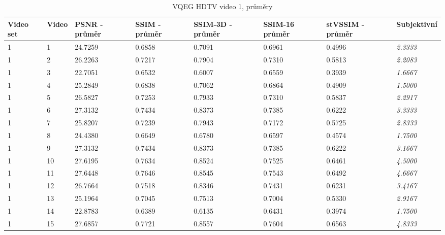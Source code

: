 \documentclass[thesis=M,czech]{FITthesis}[2016/06/26]
\begin{document}
\begin{table}[]
\centering
\begin{tabular}{|p{.85cm}|p{.85cm}|p{1.3cm}|p{1.3cm}|p{1.5cm}|p{1.5cm}|p{1.5cm}|p{1.8cm}|}
\hline
Video set & Video & PSNR - průměr & SSIM - průměr & SSIM-3D - průměr & SSIM-16 průměr & stVSSIM - průměr & Subjektivní \\ \hline
1         & 1     & 24.7259       & 0.6858        & 0.7091           & 0.6961         & 0.4996           & \textit{2.3333}      \\ \hline
1         & 2     & 26.2263       & 0.7217        & 0.7904           & 0.7310         & 0.5813           & \textit{2.2083}      \\ \hline
1         & 3     & 22.7051       & 0.6532        & 0.6007           & 0.6559         & 0.3939           & \textit{1.6667}      \\ \hline
1         & 4     & 25.2849       & 0.6838        & 0.7062           & 0.6864         & 0.4909           & \textit{1.5000}      \\ \hline
1         & 5     & 26.5827       & 0.7253        & 0.7933           & 0.7310         & 0.5837           & \textit{2.2917}      \\ \hline
1         & 6     & 27.3132       & 0.7434        & 0.8373           & 0.7385         & 0.6222           & \textit{3.3333}     \\ \hline
1         & 7     & 25.8207       & 0.7239        & 0.7943           & 0.7172         & 0.5725           & \textit{2.8333}      \\ \hline
1         & 8     & 24.4380       & 0.6649        & 0.6780           & 0.6597         & 0.4574           & \textit{1.7500}      \\ \hline
1         & 9     & 27.3132       & 0.7434        & 0.8373           & 0.7385         & 0.6222           & \textit{3.1667}      \\ \hline
1         & 10    & 27.6195       & 0.7634        & 0.8524           & 0.7525         & 0.6461           & \textit{4.5000}      \\ \hline
1         & 11    & 27.6448       & 0.7646        & 0.8545           & 0.7543         & 0.6492           & \textit{4.6667}      \\ \hline
1         & 12    & 26.7664       & 0.7518        & 0.8346           & 0.7431         & 0.6231           & \textit{3.4167}      \\ \hline
1         & 13    & 25.1964       & 0.7045        & 0.7513           & 0.7004         & 0.5330           & \textit{2.9167}      \\ \hline
1         & 14    & 22.8783       & 0.6389        & 0.6135           & 0.6431         & 0.3974           & \textit{1.7500}      \\ \hline
1         & 15    & 27.6857       & 0.7721        & 0.8557           & 0.7604         & 0.6563           & \textit{4.8333}      \\ \hline
\end{tabular}
\caption{VQEG HDTV video 1, průměry}
\label{tab:VQEGHD1_1_avg}
\end{table}
\end{document}
